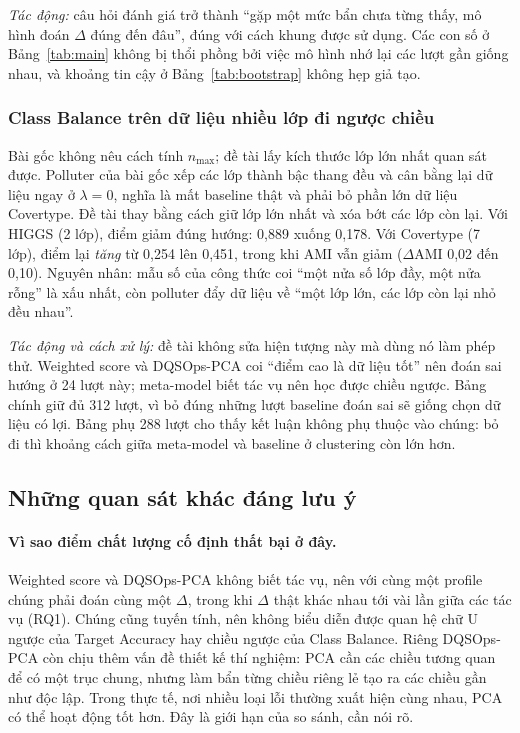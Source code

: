 \emph{Tác động:} câu hỏi đánh giá trở thành ``gặp một mức bẩn chưa từng thấy, mô hình đoán $\Delta$ đúng đến đâu'', đúng với cách khung được sử dụng. Các con số ở Bảng~\ref{tab:main} không bị thổi phồng bởi việc mô hình nhớ lại các lượt gần giống nhau, và khoảng tin cậy ở Bảng~\ref{tab:bootstrap} không hẹp giả tạo.

\subsubsection{Class Balance trên dữ liệu nhiều lớp đi ngược chiều}
\label{sec:kb-balance}
Bài gốc không nêu cách tính $n_{\max}$; đề tài lấy kích thước lớp lớn nhất quan sát được. Polluter của bài gốc xếp các lớp thành bậc thang đều và cân bằng lại dữ liệu ngay ở $\lambda = 0$, nghĩa là mất baseline thật và phải bỏ phần lớn dữ liệu Covertype. Đề tài thay bằng cách giữ lớp lớn nhất và xóa bớt các lớp còn lại. Với HIGGS (2 lớp), điểm giảm đúng hướng: 0,889 xuống 0,178. Với Covertype (7 lớp), điểm lại \emph{tăng} từ 0,254 lên 0,451, trong khi AMI vẫn giảm ($\Delta$AMI 0,02 đến 0,10). Nguyên nhân: mẫu số của công thức coi ``một nửa số lớp đầy, một nửa rỗng'' là xấu nhất, còn polluter đẩy dữ liệu về ``một lớp lớn, các lớp còn lại nhỏ đều nhau''.

\emph{Tác động và cách xử lý:} đề tài không sửa hiện tượng này mà dùng nó làm phép thử. Weighted score và DQSOps-PCA coi ``điểm cao là dữ liệu tốt'' nên đoán sai hướng ở 24 lượt này; meta-model biết tác vụ nên học được chiều ngược. Bảng chính giữ đủ 312 lượt, vì bỏ đúng những lượt baseline đoán sai sẽ giống chọn dữ liệu có lợi. Bảng phụ 288 lượt cho thấy kết luận không phụ thuộc vào chúng: bỏ đi thì khoảng cách giữa meta-model và baseline ở clustering còn lớn hơn.

\subsection{Những quan sát khác đáng lưu ý}

\paragraph{Vì sao điểm chất lượng cố định thất bại ở đây.} Weighted score và DQSOps-PCA không biết tác vụ, nên với cùng một profile chúng phải đoán cùng một $\Delta$, trong khi $\Delta$ thật khác nhau tới vài lần giữa các tác vụ (RQ1). Chúng cũng tuyến tính, nên không biểu diễn được quan hệ chữ U ngược của Target Accuracy hay chiều ngược của Class Balance. Riêng DQSOps-PCA còn chịu thêm vấn đề thiết kế thí nghiệm: PCA cần các chiều tương quan để có một trục chung, nhưng làm bẩn từng chiều riêng lẻ tạo ra các chiều gần như độc lập. Trong thực tế, nơi nhiều loại lỗi thường xuất hiện cùng nhau, PCA có thể hoạt động tốt hơn. Đây là giới hạn của so sánh, cần nói rõ.

